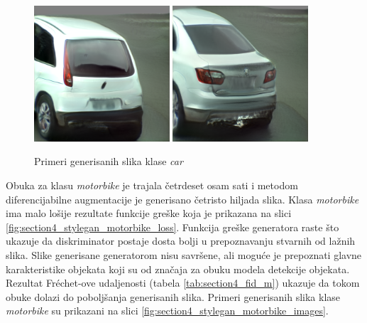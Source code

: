 \documentclass[12pt,oneside]{memoir}
\begin{document}
\begin{figure}[!htbp]
\centering
    \includegraphics[width=0.45\textwidth]{matfmaster/stylegan/car/image1.png}  \includegraphics[width=0.45\textwidth]{matfmaster/stylegan/car/image2.png}
\caption{Primeri generisanih slika klase \textit{car}}
\label{fig:section4_stylegan_car_images}
\end{figure}


\clearpage
Obuka za klasu \textit{motorbike} je trajala četrdeset osam sati i metodom diferencijabilne augmentacije je generisano četristo hiljada slika. Klasa \textit{motorbike} ima malo lošije rezultate funkcije greške koja je prikazana na slici \ref{fig:section4_stylegan_motorbike_loss}. Funkcija greške generatora raste što ukazuje da diskriminator postaje dosta bolji u prepoznavanju stvarnih od lažnih slika. Slike generisane generatorom nisu savršene, ali moguće je prepoznati glavne karakteristike objekata koji su od značaja za obuku modela detekcije objekata. Rezultat Fréchet-ove udaljenosti (tabela \ref{tab:section4_fid_m}) ukazuje da tokom obuke dolazi do poboljšanja generisanih slika. Primeri generisanih slika klase \textit{motorbike} su prikazani na slici \ref{fig:section4_stylegan_motorbike_images}.
\end{document}
